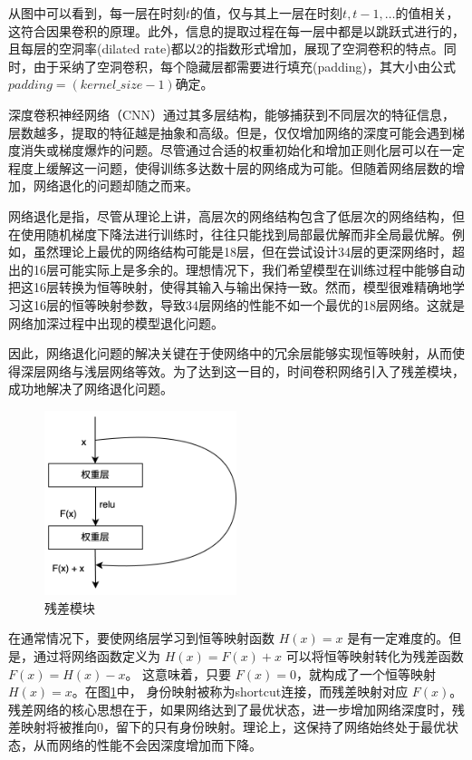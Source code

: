 从图中可以看到，每一层在时刻$t$的值，仅与其上一层在时刻$t, t-1, \dots$的值相关，这符合因果卷积的原理。此外，信息的提取过程在每一层中都是以跳跃式进行的，且每层的空洞率(dilated rate)都以2的指数形式增加，展现了空洞卷积的特点。同时，由于采纳了空洞卷积，每个隐藏层都需要进行填充(padding)，其大小由公式$padding = (kernel\_size - 1)$确定。

深度卷积神经网络（CNN）通过其多层结构，能够捕获到不同层次的特征信息，层数越多，提取的特征越是抽象和高级。但是，仅仅增加网络的深度可能会遇到梯度消失或梯度爆炸的问题。尽管通过合适的权重初始化和增加正则化层可以在一定程度上缓解这一问题，使得训练多达数十层的网络成为可能。但随着网络层数的增加，网络退化的问题却随之而来\cite{吕国豪2014基于卷积神经网络的正则化方法}。

网络退化是指，尽管从理论上讲，高层次的网络结构包含了低层次的网络结构，但在使用随机梯度下降法进行训练时，往往只能找到局部最优解而非全局最优解。例如，虽然理论上最优的网络结构可能是18层，但在尝试设计34层的更深网络时，超出的16层可能实际上是多余的。理想情况下，我们希望模型在训练过程中能够自动把这16层转换为恒等映射，使得其输入与输出保持一致。然而，模型很难精确地学习这16层的恒等映射参数，导致34层网络的性能不如一个最优的18层网络。这就是网络加深过程中出现的模型退化问题。

因此，网络退化问题的解决关键在于使网络中的冗余层能够实现恒等映射，从而使得深层网络与浅层网络等效。为了达到这一目的，时间卷积网络引入了残差模块，成功地解决了网络退化问题。

\begin{figure}[htbp]
	\centering
	\includegraphics[width=0.5\textwidth]{figures/residual_block.png}
	\caption{残差模块}
	\label{residual_block}
\end{figure}

在通常情况下，要使网络层学习到恒等映射函数 $H(x) = x$ 是有一定难度的。但是，通过将网络函数定义为 $H(x) = F(x) + x$ 可以将恒等映射转化为残差函数 $F(x) = H(x) - x$。 这意味着，只要  $F(x) = 0$，就构成了一个恒等映射 $H(x) = x$。在图\ref{residual_block}中，
身份映射被称为shortcut连接，而残差映射对应 $F(x)$。残差网络的核心思想在于，如果网络达到了最优状态，进一步增加网络深度时，残差映射将被推向0，留下的只有身份映射。理论上，这保持了网络始终处于最优状态，从而网络的性能不会因深度增加而下降。

